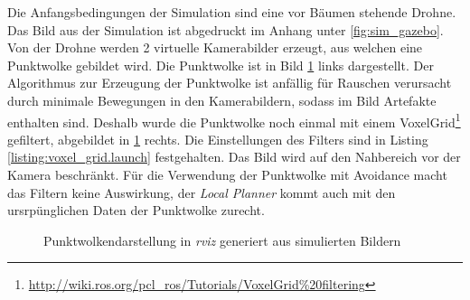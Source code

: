 Die Anfangsbedingungen der Simulation sind eine vor Bäumen stehende Drohne. Das Bild aus der Simulation ist abgedruckt im Anhang unter \ref{fig:sim_gazebo}. Von der Drohne werden 2 virtuelle Kamerabilder erzeugt, aus welchen eine Punktwolke gebildet wird. Die Punktwolke ist in Bild \ref{fig:sim_gazebo_stereo} links dargestellt. Der Algorithmus zur Erzeugung der Punktwolke ist anfällig für Rauschen verursacht durch minimale Bewegungen in den Kamerabildern, sodass im Bild Artefakte enthalten sind. Deshalb wurde die Punktwolke noch einmal mit einem VoxelGrid\footnote{\url{http://wiki.ros.org/pcl_ros/Tutorials/VoxelGrid\%20filtering}\cite{openroboticsDocumentationROSWiki}} gefiltert, abgebildet in \ref{fig:sim_gazebo_stereo} rechts. Die Einstellungen des Filters sind in Listing \ref{listing:voxel_grid.launch} festgehalten. Das Bild wird auf den Nahbereich vor der Kamera beschränkt. Für die Verwendung der Punktwolke mit Avoidance macht das Filtern keine Auswirkung, der \textit{Local Planner} kommt auch mit den ursrpünglichen Daten der Punktwolke zurecht.

\begin{figure}[!ht]
    \centering
    \hfill
    \hfill
    \caption[Punktwolkendarstellung in \textit{rviz}]{Punktwolkendarstellung in \textit{rviz} generiert aus simulierten Bildern}
    \label{fig:sim_gazebo_stereo}
\end{figure}

